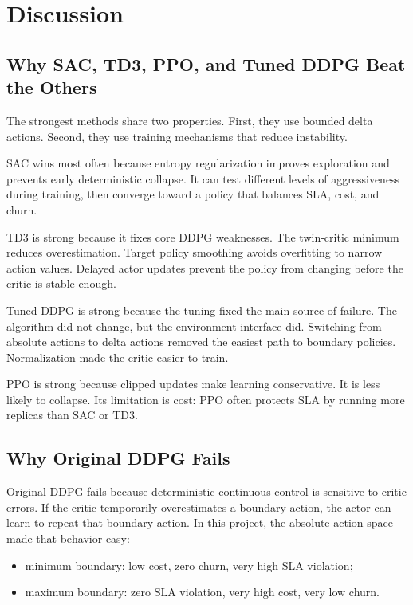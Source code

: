 \documentclass{rapportINPTCLOUD}
\begin{document}
\chapter{Discussion}
\label{chap:discussion}

\section{Why SAC, TD3, PPO, and Tuned DDPG Beat the Others}

The strongest methods share two properties. First, they use bounded delta actions. Second, they use training mechanisms that reduce instability.

SAC wins most often because entropy regularization improves exploration and prevents early deterministic collapse. It can test different levels of aggressiveness during training, then converge toward a policy that balances SLA, cost, and churn.

TD3 is strong because it fixes core DDPG weaknesses. The twin-critic minimum reduces overestimation. Target policy smoothing avoids overfitting to narrow action values. Delayed actor updates prevent the policy from changing before the critic is stable enough.

Tuned DDPG is strong because the tuning fixed the main source of failure. The algorithm did not change, but the environment interface did. Switching from absolute actions to delta actions removed the easiest path to boundary policies. Normalization made the critic easier to train.

PPO is strong because clipped updates make learning conservative. It is less likely to collapse. Its limitation is cost: PPO often protects SLA by running more replicas than SAC or TD3.

\section{Why Original DDPG Fails}

Original DDPG fails because deterministic continuous control is sensitive to critic errors. If the critic temporarily overestimates a boundary action, the actor can learn to repeat that boundary action. In this project, the absolute action space made that behavior easy:

\begin{itemize}
  \item minimum boundary: low cost, zero churn, very high SLA violation;
  \item maximum boundary: zero SLA violation, very high cost, very low churn.
\end{itemize}
\end{document}
